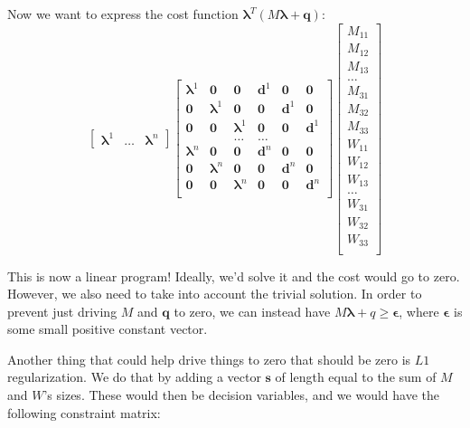 \documentclass{article}
\renewcommand{\vec}[1]{\boldsymbol{#1}}
\begin{document}
Now we want to express the cost function $\vec{\lambda}^T (M \vec{\lambda} + \vec{q})$:
\[
    \begin{bmatrix}
        \vec{\lambda} ^1 & \dots & \vec{\lambda} ^n
    \end{bmatrix}
    \begin{bmatrix}
        \vec{\lambda} ^1 & \vec{0} & \vec{0} & \vec{d}^1 & \vec{0} & \vec{0} \\
        \vec{0} & \vec{\lambda} ^1 & \vec{0} & \vec{0} & \vec{d}^1 & \vec{0} \\
        \vec{0} & \vec{0} & \vec{\lambda} ^1 & \vec{0} & \vec{0} & \vec{d}^1 \\
                & & \dots & \dots & & \\
        \vec{\lambda} ^n & \vec{0} & \vec{0} & \vec{d}^n & \vec{0} & \vec{0} \\
        \vec{0} & \vec{\lambda} ^n & \vec{0} & \vec{0} & \vec{d}^n & \vec{0} \\
        \vec{0} & \vec{0} & \vec{\lambda} ^n & \vec{0} & \vec{0} & \vec{d}^n \\
    \end{bmatrix}
    \begin{bmatrix}
        M_{11} \\
        M_{12} \\
        M_{13} \\
        \dots \\
        M_{31} \\
        M_{32} \\
        M_{33} \\
        W_{11} \\
        W_{12} \\
        W_{13} \\
        \dots \\
        W_{31} \\
        W_{32} \\
        W_{33} \\
    \end{bmatrix}
\]

This is now a linear program! Ideally, we'd solve it and the cost would go to zero. However, we also need to take into account the trivial solution. In order to prevent just driving $M$ and $\vec{q}$ to zero, we can instead have $M \vec{\lambda} + q \geq \vec{\epsilon}$, where $\vec{\epsilon}$ is some small positive constant vector.

Another thing that could help drive things to zero that should be zero is $L1$ regularization. We do that by adding a vector $\vec{s}$ of length equal to the sum of $M$ and $W$'s sizes. These would then be decision variables, and we would have the following constraint matrix:
\end{document}
